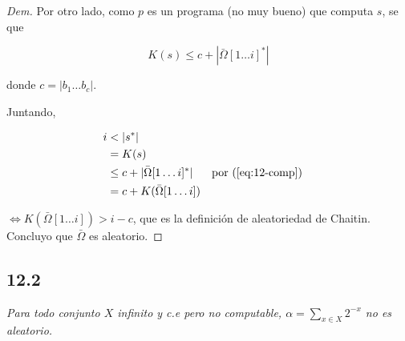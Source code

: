 \documentclass{article}
\theoremstyle{definition} %
\newcommand{\first}[2]{#2[1 \dots #1]}
\begin{document}
\begin{proof}[Dem]
    Por otro lado, como $p$ es un programa (no muy bueno) que computa $s$, se que

    \begin{equation}\label{eq:12-comp}
         K(s) \leq c + |\first{i}{\bar{\Omega}}^*|
    \end{equation}

    donde $c = |b_1 \dots b_c|$.

    Juntando,

    \begin{align*}
        i
            &< |s^*|\\
            &= K(s)\\
            &\leq c + |\first{i}{\bar{\Omega}}^*|
            &&\text{por (\ref{eq:12-comp})}\\
            &= c + K(\first{i}{\bar{\Omega}})
    \end{align*}

    $\iff K(\first{i}{\bar{\Omega}}) > i - c$, que es la definición de
    aleatoriedad de Chaitin. Concluyo que $\bar{\Omega}$ es aleatorio.

\end{proof}

\subsection*{12.2}

\textit{Para todo conjunto $X$ infinito y c.e pero no computable, $\alpha =
\sum_{x \in X} 2^{-x}$ no es aleatorio.}
\end{document}
